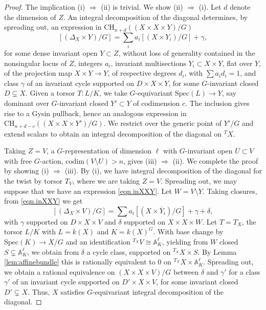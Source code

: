 \documentclass[12pt, reqno]{amsart}
\numberwithin{equation}{section}
\theoremstyle{plain}
\theoremstyle{definition}
\def\bA{{\mathbb A}}
\def\codim{\mathrm{codim}}
\def\Spec{\mathrm{Spec}}
\begin{document}
\begin{proof}
The implication (i) $\Rightarrow$ (ii) is trivial.
We show (ii) $\Rightarrow$ (i).
Let $d$ denote the dimension of $Z$.
An integral decomposition of the diagonal determines, by spreading out, an expression in $\mathrm{CH}_{n+d}((X\times X\times Y)/G)$
\begin{equation}
\label{eqn.inXXY}
[(\Delta_X\times Y)/G]=\sum_i a_i [(X\times Y_i)/G]+\gamma,
\end{equation}
for some dense invariant open $Y\subset Z$,
without loss of generality contained in the nonsingular locus of $Z$, integers $a_i$,
invariant multisections $Y_i\subset X\times Y$, flat over $Y$, of the projection map $X\times Y\to Y$, of respective degrees $d_i$, with $\sum a_i d_i=1$, and class $\gamma$ of an invariant cycle supported on $D\times X\times Y$, for some $G$-invariant closed $D\subsetneq X$.
Given a torsor $T\colon L/K$, we take $G$-equivariant $\Spec(L)\to Y$,  say dominant over $G$-invariant closed $Y'\subset Y$ of codimension $c$.
The inclusion gives rise to a Gysin pullback, hence an analogous expression in $\mathrm{CH}_{n+d-c}((X\times X\times Y')/G)$.
We restrict over the generic point of $Y'/G$ and extend scalars to obtain an integral decomposition of the diagonal on ${}^TX$.

Taking $Z=V$, a $G$-representation of dimension $\ell$ with $G$-invariant open $U\subset V$ with free $G$-action, $\codim(V\setminus U)>n$, gives (iii) $\Rightarrow$ (ii).
We complete the proof by showing (i) $\Rightarrow$ (iii).
By (i), we have integral decomposition of the diagonal for the twist by torsor $T_V$, where we are taking $Z=V$.
Spreading out, we may suppose that we have an expression
\eqref{eqn.inXXY}.
Let $W=V\setminus Y$.
Taking closures, from \eqref{eqn.inXXY} we get
\[ [(\Delta_X\times V)/G]=\sum a_i[(X\times \overline{Y}_i)/G]+\gamma+\delta, \]
with $\gamma$ supported on $D\times X\times V$ and
$\delta$ supported on $X\times X\times W$.
Let $T=T_X$, the torsor $L/K$ with $L=k(X)$ and $K=k(X)^G$.
With base change by $\Spec(K)\to X/G$ and
an identification ${}^{T_X}V\cong\bA^\ell_K$,
yielding from $W$ closed $S\subsetneq \bA^\ell_K$,
we obtain from $\delta$ a cycle class,
supported on ${}^{T_X}X \times S$.
By Lemma \ref{lem:affinebundle} this is rationally equivalent to $0$ on ${}^{T_X}X\times \bA^\ell_K$.
Spreading out, we obtain a rational equivalence on $(X\times X\times V)/G$ between $\delta$ and $\gamma'$ for a class $\gamma'$ of an invariant cycle supported on $D'\times X\times V$, for some invariant closed $D'\subsetneq X$.
Thus, $X$ satisfies $G$-equivariant integral decomposition of the diagonal.
\end{proof}
\end{document}
